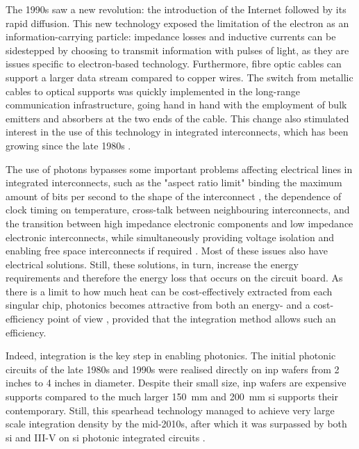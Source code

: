 The 1990s saw a new revolution: the introduction of the Internet followed by its rapid diffusion. This new technology exposed the limitation of the electron as an information-carrying particle: impedance losses and inductive currents can be sidestepped by choosing to transmit information with pulses of light, as they are issues specific to electron-based technology. Furthermore, fibre optic cables can support a larger data stream compared to copper wires. The switch from metallic cables to optical supports was quickly implemented in the long-range communication infrastructure, going hand in hand with the employment of bulk emitters and absorbers at the two ends of the cable. This change also stimulated interest in the use of this technology in integrated interconnects, which has been growing since the late 1980s \cite{Miller1989}.

The use of photons bypasses some important problems affecting electrical lines in integrated interconnects, such as the "aspect ratio limit" binding the maximum amount of bits per second to the shape of the interconnect \cite{Miller1997}, the dependence of clock timing on temperature, cross-talk between neighbouring interconnects, and the transition between high impedance electronic components and low impedance electronic interconnects, while simultaneously providing voltage isolation and enabling free space interconnects if required \cite{Miller1997_reasons}. Most of these issues also have electrical solutions. Still, these solutions, in turn, increase the energy requirements and therefore the energy loss that occurs on the circuit board. As there is a limit to how much heat can be cost-effectively extracted from each singular chip, photonics becomes attractive from both an energy- and a cost-efficiency point of view \cite{Miller2009}, provided that the integration method allows such an efficiency. 

Indeed, integration is the key step in enabling photonics. The initial photonic circuits of the late 1980s and 1990s were realised directly on \acf{inp} wafers from \num{2} inches to \num{4} inches in diameter. Despite their small size, \acs{inp} wafers are expensive supports compared to the much larger \qty{150}{\milli\metre} and \qty{200}{\milli\metre} \acl{si} supports their contemporary. Still, this spearhead technology managed to achieve very large scale integration density by the mid-2010s, after which it was surpassed by both \acl{si} and III-V on \acl{si} photonic integrated circuits \cite{Shekhar2024, Margalit2021}.

